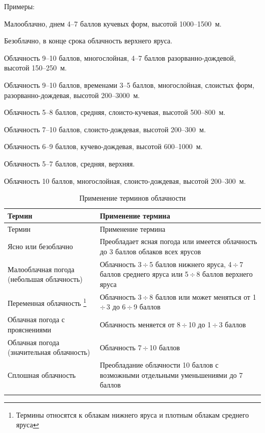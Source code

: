 \documentclass[a4paper, 12pt, twoside, draft, book, russian, fittopage, cyremdash, openright]{ncc}
\newcommand{\otdo}{\,\ensuremath{\div}\,}
\begin{document}
Примеры:
\begin{list}{}{}
\item Малооблачно, днем 4--7 баллов кучевых форм, высотой 1000--1500~м.
\item Безоблачно, в конце срока облачность верхнего яруса.
\item Облачность 9--10 баллов, многослойная, 4--7 баллов разорванно-дождевой, высотой 150--250~м.
\item Облачность 9--10 баллов, временами 3--5 баллов, многослойная, слоистых форм, разорванно-дождевая, высотой 200--3000~м.
\item Облачность 5--8 баллов, средняя, слоисто-кучевая, высотой 500--800~м.
\item Облачность 7--10 баллов, слоисто-дождевая, высотой 200--300~м.
\item Облачность 6--9 баллов, кучево-дождевая, высотой 600--1000~м.
\item Облачность 5--7 баллов, средняя, верхняя.
\item Облачность 10 баллов, многослойная, слоисто-дождевая, высотой 200--300~м.
\end{list}

\begin{longtable}{p{}|p{}}
  \toprule
  Термин & Применение термина \\
  \midrule
  \endfirsthead
  \toprule
  Термин & Применение термина \\
  \midrule
  \endhead
  Ясно или безоблачно
         & Преобладает ясная погода или имеется облачность до 3 баллов облаков всех ярусов \\
  \midrule
  Малооблачная погода (небольшая облачность)
         & Облачность 3\otdo5 баллов нижнего яруса, 4\otdo7 баллов среднего яруса или 5\otdo8 баллов верхнего яруса \\
  \midrule
  Переменная облачность \footnote{Термины относятся к облакам нижнего яруса и плотным облакам среднего яруса}
         & Облачность 3\otdo8 баллов или может меняться от 1\otdo3 до 6\otdo9 баллов \\
  \midrule
  Облачная погода с прояснениями
         & Облачность меняется от 8\otdo10 до 1\otdo3 баллов \\
  \midrule
  Облачная погода (значительная облачность)
         & Облачность 7\otdo10 баллов \\
  \midrule
  Сплошная облачность
         & Преобладание облачности 10 баллов с возможными отдельными уменьшениями до 7 баллов \\
  \bottomrule
  \caption{Применение терминов облачности}
\end{longtable}
\end{document}
